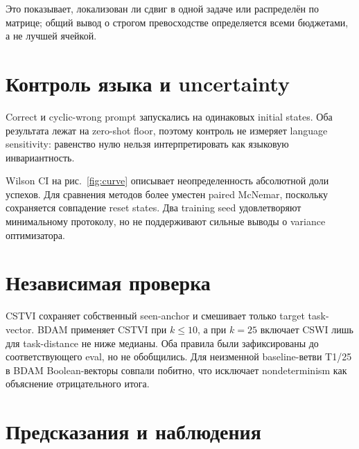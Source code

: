 \documentclass[10pt,twocolumn]{article}
\newcommand{\tightcaption}[1]{\caption{#1}\vspace{-3pt}}
\begin{document}
\begin{table}[h]
\centering\small
\resizebox{\linewidth}{!}{\PerTaskTable}
\tightcaption{Baseline$\to$CSWI, \%; 40 эпизодов на ячейку task--budget.}
\label{tab:tasks}
\end{table}

\TaskDecompositionText Это показывает, локализован ли сдвиг в одной задаче или распределён по
матрице; общий вывод о строгом превосходстве определяется всеми бюджетами, а не лучшей ячейкой.

\newpage
\section{Контроль языка и uncertainty}

\LanguageText Correct и cyclic-wrong prompt запускались на одинаковых initial states. Оба результата
лежат на zero-shot floor, поэтому контроль не измеряет language sensitivity: равенство нулю нельзя
интерпретировать как языковую инвариантность.

Wilson CI на рис.~\ref{fig:curve} описывает неопределенность абсолютной доли успехов. Для сравнения
методов более уместен paired McNemar, поскольку сохраняется совпадение reset states. Два training
seed удовлетворяют минимальному протоколу, но не поддерживают сильные выводы о variance оптимизатора.

\section{Независимая проверка}

\begin{table}[h]
\centering\small
\RobustnessTable
\tightcaption{Изменение success, п.п., относительно свежего paired baseline. Каждая строка: 360
method и 360 baseline outcomes; seed 1000 --- исходная фаза, 2000/3000 --- новые состояния.}
\label{tab:robustness}
\end{table}

CSTVI сохраняет собственный seen-anchor и смешивает только target task-vector. BDAM применяет CSTVI
при $k\le10$, а при $k=25$ включает CSWI лишь для task-distance не ниже медианы. Оба правила были
зафиксированы до соответствующего eval, но не обобщились. Для неизменной baseline-ветви T1/25 в
BDAM Boolean-векторы совпали побитно, что исключает nondeterminism как объяснение отрицательного итога.

\section{Предсказания и наблюдения}
\end{document}
